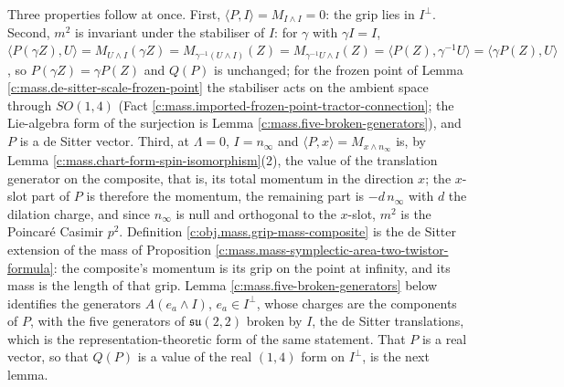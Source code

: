 \documentclass[11pt]{article}
\theoremstyle{definition}
\theoremstyle{plain}
\providecommand{\ip}{}\renewcommand{\ip}[2]{\langle #1, #2\rangle}
\begin{document}
\label{c:note.mass.setting-grip-composite-frozen-point-2}
Three properties follow at once. First, $\ip{P}{I} = M_{I\wedge I} = 0$: the grip lies in $I^{\perp}$. Second, $m^{2}$ is invariant under the stabiliser of $I$: for $\gamma$ with $\gamma I = I$, $\ip{P(\gamma Z)}{U} = M_{U\wedge I}(\gamma Z) = M_{\gamma^{-1}(U\wedge I)}(Z) = M_{\gamma^{-1}U\wedge I}(Z) = \ip{P(Z)}{\gamma^{-1}U} = \ip{\gamma P(Z)}{U}$, so $P(\gamma Z) = \gamma P(Z)$ and $Q(P)$ is unchanged; for the frozen point of Lemma \ref{c:mass.de-sitter-scale-frozen-point} the stabiliser acts on the ambient space through $SO(1,4)$ (Fact \ref{c:mass.imported-frozen-point-tractor-connection}; the Lie-algebra form of the surjection is Lemma \ref{c:mass.five-broken-generators}), and $P$ is a de Sitter vector. Third, at $\Lambda = 0$, $I = n_{\infty}$ and $\ip{P}{x} = M_{x\wedge n_{\infty}}$ is, by Lemma \ref{c:mass.chart-form-spin-isomorphism}(2), the value of the translation generator on the composite, that is, its total momentum in the direction $x$; the $x$-slot part of $P$ is therefore the momentum, the remaining part is $-d\,n_{\infty}$ with $d$ the dilation charge, and since $n_{\infty}$ is null and orthogonal to the $x$-slot, $m^{2}$ is the Poincar\'e Casimir $p^{2}$. Definition \ref{c:obj.mass.grip-mass-composite} is the de Sitter extension of the mass of Proposition \ref{c:mass.mass-symplectic-area-two-twistor-formula}: the composite's momentum is its grip on the point at infinity, and its mass is the length of that grip. Lemma \ref{c:mass.five-broken-generators} below identifies the generators $A(e_{a}\wedge I)$, $e_{a} \in I^{\perp}$, whose charges are the components of $P$, with the five generators of $\mathfrak{su}(2,2)$ broken by $I$, the de Sitter translations, which is the representation-theoretic form of the same statement. That $P$ is a real vector, so that $Q(P)$ is a value of the real $(1,4)$ form on $I^{\perp}$, is the next lemma.
\end{document}
